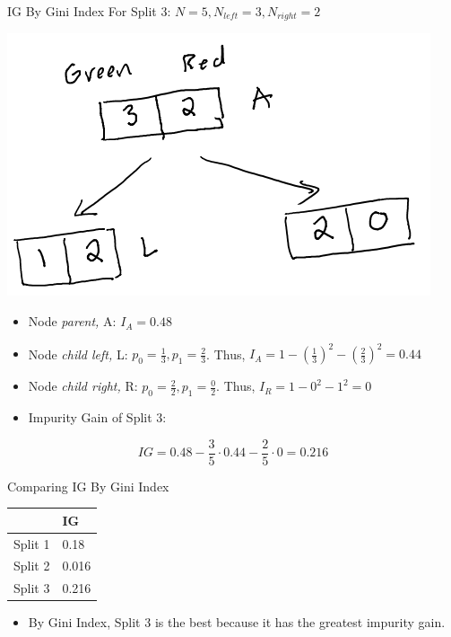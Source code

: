 \documentclass[
  ignorenonframetext,
]{beamer}
\providecommand{\tightlist}{%
  \setlength{\itemsep}{0pt}\setlength{\parskip}{0pt}}
\begin{document}
\begin{frame}{IG By Gini Index}
\protect\hypertarget{ig-by-gini-index-2}{}
For Split 3: \(N = 5, N_{left} =3, N_{right} = 2\)

\includegraphics{images/im2.png}

\begin{itemize}
\item
  Node \emph{parent,} A: \(I_{A} = 0.48\)
\item
  Node \emph{child left,} L: \(p_0 = \frac{1}{3}, p_1 = \frac{2}{3}\).
  Thus, \(I_{A} = 1-(\frac{1}{3})^2 -(\frac{2}{3})^2 = 0.44\)
\item
  Node \emph{child right,} R: \(p_0 = \frac{2}{2}, p_1 = \frac{0}{2}\).
  Thus, \(I_{R} = 1-0^2-1^2 = 0\)
\item
  Impurity Gain of Split 3:
\end{itemize}

\[IG = 0.48 - \frac{3}{5} \cdot 0.44 - \frac{2}{5} \cdot 0 = 0.216\]
\end{frame}

\begin{frame}{Comparing IG By Gini Index}
\protect\hypertarget{comparing-ig-by-gini-index}{}
\begin{longtable}[]{@{}ll@{}}
\toprule
& IG \\
\midrule
\endhead
Split 1 & 0.18 \\
Split 2 & 0.016 \\
Split 3 & 0.216 \\
\bottomrule
\end{longtable}

\begin{itemize}
\tightlist
\item
  By Gini Index, Split 3 is the best because it has the greatest
  impurity gain.
\end{itemize}
\end{frame}
\end{document}
